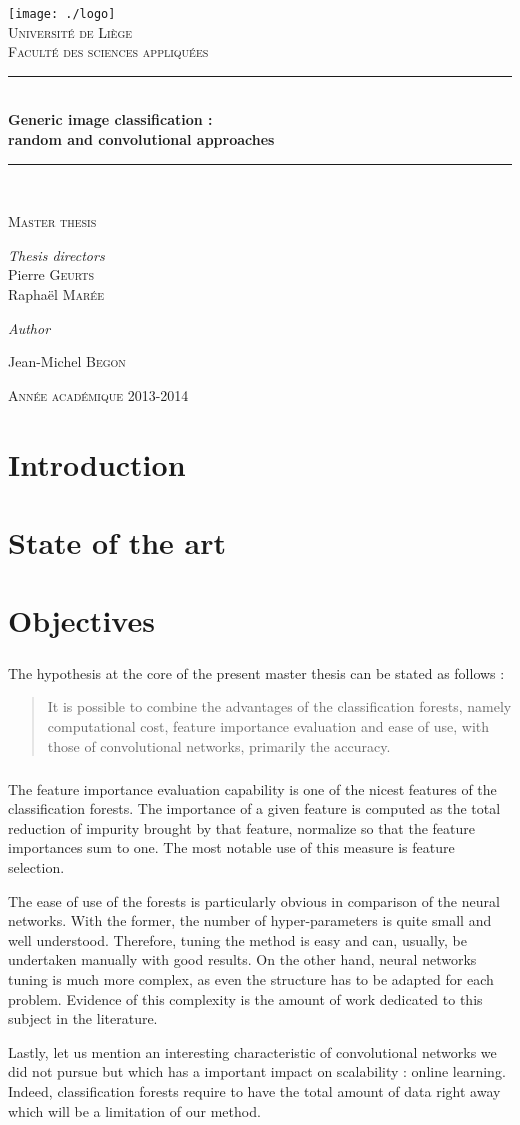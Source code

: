 \documentclass[a4paper]{report}
\newlength{\larg}
\newcommand{\titleg}{
  \begin{titlepage}
  \begin{center}

  \bigskip
  \bigskip
  \bigskip
  \bigskip 
  \bigskip


  \texttt{[image: ./logo]}\\[1cm]
  \smallskip
  \textsc{\LARGE Université de Liège}\\
  \smallskip
  \textsc{Faculté des sciences appliquées}\\

  \bigskip



  \rule{\columnwidth}{1pt} \\[0.4cm] 
  { \huge \bfseries Generic image classification : \\ \bigskip random and convolutional approaches}\\[0.4cm]
  \rule{\columnwidth}{1pt} \\[0.2cm]



  \begin{minipage}{0.7\textwidth} 
  \begin{center} \large 
  \textsc{Master thesis}
  \end{center} \end{minipage}

  \vfill


  \begin{minipage}{0.7\textwidth} \begin{center}
  \textit{Thesis directors} \\
  \large Pierre \textsc{Geurts} \\
  \large Raphaël \textsc{Marée} 
  \end{center} \end{minipage} 

  \bigskip
  \bigskip
  \bigskip

  \textit{Author} \\
  \begin{minipage}{0.7\textwidth} \begin{center}
  \large Jean-Michel \textsc{Begon}
  \end{center} \end{minipage} 
  


  \bigskip
  \bigskip
  \bigskip

  \textsc{Année académique 2013-2014}
  \end{center}
  \end{titlepage}
}
\begin{document}
\titleg
\thispagestyle{empty}
\newpage

\pagestyle{fancy}
\lhead{}
\chead{}
\rhead{\itshape \textcolor{gris}{Generic image classification}}
\lfoot{\itshape \textcolor{gris}{The RandConv framework}}
\cfoot{}
\rfoot{\itshape \textcolor{gris}{\thepage}}
\renewcommand{\headrulewidth}{0.4pt}
\renewcommand{\footrulewidth}{0.4pt}

\newpage 


\tableofcontents

\chapter{Introduction}

\chapter{State of the art}

\chapter{Objectives}
\paragraph{}
The hypothesis at the core of the present master thesis can be stated as follows : 
\begin{quote}
It is possible to combine the advantages of the classification forests, namely computational cost, feature importance evaluation and ease of use, with those of convolutional networks, primarily the accuracy.
\end{quote}
\paragraph{}
The feature importance evaluation capability is one of the nicest features of the classification forests. The importance of a given feature is computed as the total reduction of impurity brought by that feature, normalize so that the feature importances sum to one. The most notable use of this measure is feature selection. 
\par
The ease of use of the forests is particularly obvious in comparison of the neural networks. With the former, the number of hyper-parameters is quite small and well understood. Therefore, tuning the method is easy and can, usually, be undertaken manually with good results. On the other hand, neural networks tuning is much more complex, as even the structure has to be adapted for each problem. Evidence of this complexity is the amount of work dedicated to this subject in the literature. %
\par
Lastly, let us mention an interesting characteristic of convolutional networks we did not pursue but which has a important impact on scalability : online learning. Indeed, classification forests require to have the total amount of data right away which will be a limitation of our method.
\end{document}

